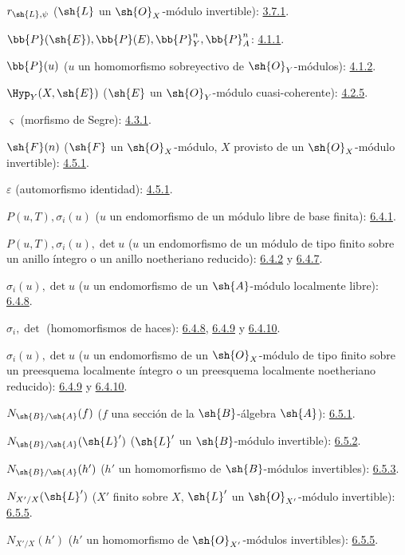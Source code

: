 \documentclass[oneside,10pt]{amsart}
\begin{document}
$r_{\sh{L},\psi}$ ($\sh{L}$ un $\sh{O}_X$-módulo invertible): \hyperref[II.3.7.1]{3.7.1}.

$\bb{P}(\sh{E}),\bb{P}(E),\bb{P}_Y^n,\bb{P}_A^n$: \hyperref[II.4.1.1]{4.1.1}.

$\bb{P}(u)$ ($u$ un homomorfismo sobreyectivo de $\sh{O}_Y$-módulos): \hyperref[II.4.1.2]{4.1.2}.

$\Hyp_Y(X,\sh{E})$ ($\sh{E}$ un $\sh{O}_Y$-módulo cuasi-coherente): \hyperref[II.4.2.5]{4.2.5}.

$\varsigma$ (morfismo de Segre): \hyperref[II.4.3.1]{4.3.1}.

$\sh{F}(n)$ ($\sh{F}$ un $\sh{O}_X$-módulo, $X$ provisto de un
$\sh{O}_X$-módulo invertible): \hyperref[II.4.5.1]{4.5.1}.

$\varepsilon$ (automorfismo identidad): \hyperref[II.4.5.1]{4.5.1}.

$P(u,T),\sigma_i(u)$ ($u$ un endomorfismo de un módulo libre de base finita): \hyperref[II.6.4.1]{6.4.1}.

$P(u,T),\sigma_i(u),\det u$
($u$ un endomorfismo de un módulo de tipo finito sobre un anillo íntegro o un
anillo noetheriano reducido): \hyperref[II.6.4.2]{6.4.2} y \hyperref[II.6.4.7]{6.4.7}.

$\sigma_i(u),\det u$ ($u$ un endomorfismo de un $\sh{A}$-módulo localmente libre): \hyperref[II.6.4.8]{6.4.8}.

$\sigma_i,\det$ (homomorfismos de haces): \hyperref[II.6.4.8]{6.4.8}, \hyperref[II.6.4.9]{6.4.9} y \hyperref[II.6.4.10]{6.4.10}.

$\sigma_i(u),\det u$
($u$ un endomorfismo de un $\sh{O}_X$-módulo de tipo finito sobre un preesquema
localmente íntegro o un preesquema localmente noetheriano reducido):
\hyperref[II.6.4.9]{6.4.9} y \hyperref[II.6.4.10]{6.4.10}.

$N_{\sh{B}/\sh{A}}(f)$
($f$ una sección de la $\sh{B}$-álgebra $\sh{A}$): \hyperref[II.6.5.1]{6.5.1}.

$N_{\sh{B}/\sh{A}}(\sh{L}')$
($\sh{L}'$ un $\sh{B}$-módulo invertible): \hyperref[II.6.5.2]{6.5.2}.

$N_{\sh{B}/\sh{A}}(h')$
($h'$ un homomorfismo de $\sh{B}$-módulos invertibles): \hyperref[II.6.5.3]{6.5.3}.

$N_{X'/X}(\sh{L}')$
($X'$ finito sobre $X$, $\sh{L}'$ un $\sh{O}_{X'}$-módulo invertible): \hyperref[II.6.5.5]{6.5.5}.

$N_{X'/X}(h')$
($h'$ un homomorfismo de $\sh{O}_{X'}$-módulos invertibles): \hyperref[II.6.5.5]{6.5.5}.
\end{document}
